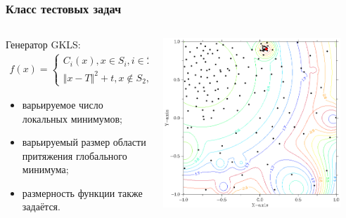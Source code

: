 \documentclass[aspectratio=1610]{beamer}
\begin{document}
\begin{frame}
  \frametitle{Класс тестовых задач}
  \begin{columns}
    \begin{column}{0.5\textwidth}
      Генератор GKLS:
      \begin{displaymath}
        \begin{matrix}
          f(x)=
          \left\{
          \begin{matrix}
          C_i(x), x \in S_i, i\in 2,\dots ,m \\
          \Vert x-T \Vert^2 + t, x\not\in S_2,\dots,S_m
          \end{matrix} \right.
        \end{matrix}
      \end{displaymath}

      \begin{itemize}
        \item варьируемое число локальных минимумов;
        \item варьируемый размер области притяжения глобального минимума;
        \item размерность функции также задаётся.
      \end{itemize}
    \end{column}
    \begin{column}{0.5\textwidth}
      \centerline{\includegraphics[width=0.9\textwidth]{gkls_color.png}}
    \end{column}
  \end{columns}
\end{frame}
\end{document}
